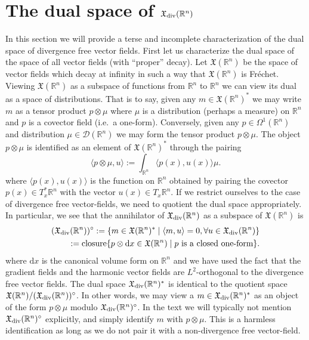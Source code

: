 \documentclass[12pt]{amsart}
\newcommand{\R}{\ensuremath{\mathbb{R}}}
\newcommand{\dx}{\ensuremath{\textrm{d}x}}
\begin{document}
\section{The dual space of $\mathfrak{X}_{\rm div}(\R^n)$}
\label{sec:measure_valued_momap}
In this section we will provide a terse and incomplete
characterization of the dual space of divergence free
vector fields.  First let us characterize the dual space of the space of all vector fields (with ``proper'' decay).
Let $\mathfrak{X}(\R^n)$ be the space of vector fields which decay at infinity
in such a way that $\mathfrak{X}(\R^n)$ is Fr\'echet.
Viewing $\mathfrak{X}(\R^n)$ as a subspace of functions from $\R^n$ to $\R^n$
we can view its dual as a space of distributions.
That is to say, given any $m \in \mathfrak{X}(\R^n)^*$ we may write $m$ as a tensor
product $p \otimes \mu$ where $\mu$ is a distribution (perhaps a measure)
on $\R^n$ and $p$ is a covector field (i.e.\ a one-form).
Conversely, given any $p \in \Omega^1(\R^n)$ and distribution $\mu \in \mathcal{D}(\R^n)$
we may form the tensor product $p \otimes \mu$.
The object $p\otimes \mu$ is identified as an element of $\mathfrak{X}(\R^n)^*$ through
the pairing
\begin{equation*}
	\langle p \otimes \mu , u \rangle :=  \int_{\R^n} \langle p(x) , u(x) \rangle \mu.
\end{equation*}
where $\langle p(x),u(x) \rangle$ is the function on $\R^n$ obtained by pairing the covector $p(x) \in T_x^*\R^n$ with the vector $u(x) \in T_x\R^n$.
If we restrict ourselves to the case of divergence free vector-fields, we need to quotient
the dual space appropriately.  In particular, we see that the annihilator of $\mathfrak{X}_{\rm div}(\R^n)$
as a subspace of $\mathfrak{X}(\R^n)$ is
\begin{align*}
	(\mathfrak{X}_{\rm div}(\R^n) )^\circ := \{ m \in \mathfrak{X}(\R^n)^* \mid \langle m , u \rangle = 0 , \forall u \in \mathfrak{X}_{\rm div}(\R^n) \}\\
		:= {\rm closure}\{ p \otimes \dx \in \mathfrak{X}(\R^n) \mid p \text{ is a closed one-form} \}.
\end{align*}
where $\dx$ is the canonical volume form on $\R^n$ and
we have used the fact that the gradient fields and the harmonic vector fields are $L^2$-orthogonal to the divergence free vector fields.
The dual space $\mathfrak{X}_{\rm div}(\R^n)^*$ is identical to the quotient space $\mathfrak{X}(\R^n) / (\mathfrak{X}_{\rm div}(\R^n))^\circ$.
In other words, we may view a $m \in \mathfrak{X}_{\rm div}(\R^n)^*$ as an object of the form $p \otimes \mu$ modulo $\mathfrak{X}_{\rm div}(\R^n)^\circ$.
In the text we will typically not mention $\mathfrak{X}_{\rm div}(\R^n)^\circ$ explicitly, and simply identify $m$ with $p \otimes \mu$.
This is a harmless identification as long as we do not pair it with a non-divergence free vector-field.
\end{document}
